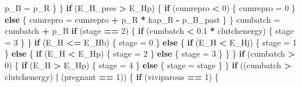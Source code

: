 \documentclass[]{article}
\newenvironment{Shaded}{\begin{snugshade}}{\end{snugshade}}
\newcommand{\DecValTok}[1]{\textcolor[rgb]{0.00,0.00,0.81}{#1}}
\newcommand{\FloatTok}[1]{\textcolor[rgb]{0.00,0.00,0.81}{#1}}
\newcommand{\StringTok}[1]{\textcolor[rgb]{0.31,0.60,0.02}{#1}}
\newcommand{\ControlFlowTok}[1]{\textcolor[rgb]{0.13,0.29,0.53}{\textbf{#1}}}
\newcommand{\OperatorTok}[1]{\textcolor[rgb]{0.81,0.36,0.00}{\textbf{#1}}}
\newcommand{\NormalTok}[1]{#1}
\begin{document}
\begin{Shaded}
\begin{Highlighting}[]
{{{\NormalTok{            p_B =}\StringTok{ }\NormalTok{p_R}
\NormalTok{        \}}
\NormalTok{    \}}
    \ControlFlowTok{if}\NormalTok{ (E_H_pres }\OperatorTok{>}\StringTok{ }\NormalTok{E_Hp) \{}
        \ControlFlowTok{if}\NormalTok{ (cumrepro }\OperatorTok{<}\StringTok{ }\DecValTok{0}\NormalTok{) \{}
\NormalTok{            cumrepro =}\StringTok{ }\DecValTok{0}
\NormalTok{        \}}
        \ControlFlowTok{else}\NormalTok{ \{}
\NormalTok{            cumrepro =}\StringTok{ }\NormalTok{cumrepro }\OperatorTok{+}\StringTok{ }\NormalTok{p_R }\OperatorTok{*}\StringTok{ }\NormalTok{kap_R }\OperatorTok{-}\StringTok{ }\NormalTok{p_B_past}
\NormalTok{        \}}
\NormalTok{    \}}
\NormalTok{    cumbatch =}\StringTok{ }\NormalTok{cumbatch }\OperatorTok{+}\StringTok{ }\NormalTok{p_B}
    \ControlFlowTok{if}\NormalTok{ (stage }\OperatorTok{==}\StringTok{ }\DecValTok{2}\NormalTok{) \{}
        \ControlFlowTok{if}\NormalTok{ (cumbatch }\OperatorTok{<}\StringTok{ }\FloatTok{0.1} \OperatorTok{*}\StringTok{ }\NormalTok{clutchenergy) \{}
\NormalTok{            stage =}\StringTok{ }\DecValTok{3}
\NormalTok{        \}}
\NormalTok{    \}}
    \ControlFlowTok{if}\NormalTok{ (E_H }\OperatorTok{<=}\StringTok{ }\NormalTok{E_Hb) \{}
\NormalTok{        stage =}\StringTok{ }\DecValTok{0}
\NormalTok{    \}}
    \ControlFlowTok{else}\NormalTok{ \{}
        \ControlFlowTok{if}\NormalTok{ (E_H }\OperatorTok{<}\StringTok{ }\NormalTok{E_Hj) \{}
\NormalTok{            stage =}\StringTok{ }\DecValTok{1}
\NormalTok{        \}}
        \ControlFlowTok{else}\NormalTok{ \{}
            \ControlFlowTok{if}\NormalTok{ (E_H }\OperatorTok{<}\StringTok{ }\NormalTok{E_Hp) \{}
\NormalTok{                stage =}\StringTok{ }\DecValTok{2}
\NormalTok{            \}}
            \ControlFlowTok{else}\NormalTok{ \{}
\NormalTok{                stage =}\StringTok{ }\DecValTok{3}
\NormalTok{            \}}
\NormalTok{        \}}
\NormalTok{    \}}
    \ControlFlowTok{if}\NormalTok{ (cumbatch }\OperatorTok{>}\StringTok{ }\DecValTok{0}\NormalTok{) \{}
        \ControlFlowTok{if}\NormalTok{ (E_H }\OperatorTok{>}\StringTok{ }\NormalTok{E_Hp) \{}
\NormalTok{            stage =}\StringTok{ }\DecValTok{4}
\NormalTok{        \}}
        \ControlFlowTok{else}\NormalTok{ \{}
\NormalTok{            stage =}\StringTok{ }\NormalTok{stage}
\NormalTok{        \}}
\NormalTok{    \}}
    \ControlFlowTok{if}\NormalTok{ ((cumbatch }\OperatorTok{>}\StringTok{ }\NormalTok{clutchenergy) }\OperatorTok{|}\StringTok{ }\NormalTok{(pregnant }\OperatorTok{==}\StringTok{ }\DecValTok{1}\NormalTok{)) \{}
        \ControlFlowTok{if}\NormalTok{ (viviparous }\OperatorTok{==}\StringTok{ }\DecValTok{1}\NormalTok{) \{}
}}}
\end{Highlighting}
\end{Shaded}
\end{document}
